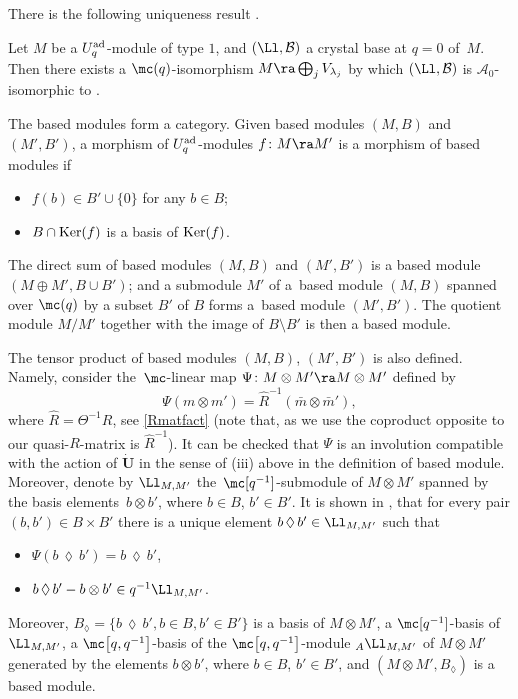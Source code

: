 There is the following uniqueness result \cite[Theorem 3]{Kashiwara1}.

\begin{teo}\label{Kashiuniqueteo} Let $M$ be a $U_q^{\rm ad}$-module of type $1$, and $(\Ll, \mathcal{B})$ a crystal base at $q=0$ of~$M$. Then there exists a $\mc(q)$-isomorphism $M\ra \bigoplus_j V_{\lambda_j}$ by which $(\Ll, \mathcal{B})$ is $\mathcal{A}_0$-isomorphic to .
\end{teo}

The based modules form a category. Given based modules $(M,B)$ and $(M',B')$, a morphism of $U_q^{\rm ad}$-modules $f\colon M\ra M'$ is a morphism of based modules if{\samepage
\begin{itemize}\itemsep=0pt
\item[(a)] $f(b)\in B'\cup\{0\}$ for any $b\in B$;
\item[(b)] $B\cap {\rm Ker}(f)$ is a basis of ${\rm Ker}(f)$.
\end{itemize}}%

\pagebreak

\noindent
The direct sum of based modules $(M,B)$ and $(M',B')$ is a based module $(M \oplus M',B\cup B')$; and a submodule $M'$ of a~based module $(M,B)$ spanned over $\mc(q)$ by a subset $B'$ of $B$ forms a~based module $(M',B')$. The quotient module $M/M'$ together with the image of $B\setminus B'$ is then a based module.

The tensor product of based modules $(M,B)$, $(M',B')$ is also defined. Namely, consider the~$\mc$-linear map $\Psi\colon M\otimes M' \ra M\otimes M'$ defined by
\[
\Psi(m\otimes m') = \hat{R}^{-1}(\bar{m}\otimes \bar{m}'),
\] where $\hat{R} = \Theta^{-1}R$, see \eqref{Rmatfact} (note that, as we use the coproduct opposite to \cite{Lusztig} our quasi-$R$-matrix is $\hat{R}^{-1}$). It can be checked that $\Psi$ is an involution compatible with the action of $\dot{\mathbf{U}}$ in the sense of (iii) above in the definition of based module. Moreover, denote by $\Ll_{M,M'}$ the~$\mc[q^{-1}]$-submodule of $M\otimes M'$ spanned by the basis elements~$b\otimes b'$, where $b\in B$, $b'\in B'$. It is shown in \cite[Section~27.3]{Lusztig}, that for every pair $(b,b')\in B\times B'$ there is a unique element $b\,\lozenge\, b'\in \Ll_{M,M'}$ such that
\begin{itemize}\itemsep=0pt
\item[(a)] $\Psi(b\,\lozenge\, b')=b\,\lozenge\, b'$,
\item[(b)] $b\,\lozenge\, b' - b\otimes b'\in q^{-1} \mathcal{\Ll}_{M,M'}$.
\end{itemize}
Moreover, $B_{\lozenge} = \{b\,\lozenge\, b', b\in B, b'\in B'\}$ is a basis of $M\otimes M'$, a $\mc[q^{-1}]$-basis of $\Ll_{M,M'}$, a $\mc\big[q,q^{-1}\big]$-basis of the $\mc\big[q,q^{-1}\big]$-module ${}_A\Ll_{M,M'}$ of $M\otimes M'$ generated by the elements $b\otimes b'$, where $b\in B$, $b'\in B'$, and $(M\otimes M',B_{\lozenge})$ is a based module.

